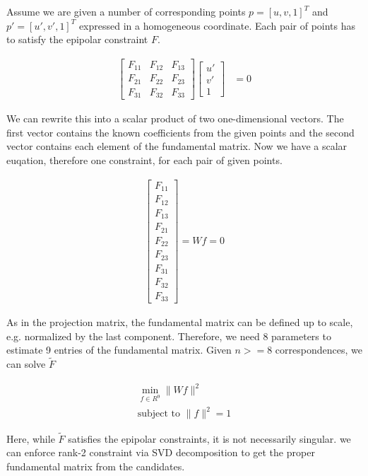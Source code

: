 \documentclass[twoside]{article}
\begin{document}
Assume we are given a number of corresponding points $p = [u, v, 1]^T$ and $p'= [u',v',1]^T$ expressed in a homogeneous coordinate. Each pair of points has to satisfy the epipolar constraint $F$.

\begin{align}
[u, v, 1] \begin{bmatrix}
F_{11} & F_{12} & F_{13} \\
F_{21} & F_{22} & F_{23} \\
F_{31} & F_{32} & F_{33}
\end{bmatrix} \begin{bmatrix}
u' \\ v' \\ 1
\end{bmatrix} &= 0
\end{align}

We can rewrite this into a scalar product of two one-dimensional vectors. The first vector contains the known coefficients from the given points and the second vector contains each element of the fundamental matrix. Now we have a scalar euqation, therefore one constraint, for each pair of given points.

\begin{align}
[uu', uv', u, vu', vv', v, u', v', 1]\begin{bmatrix}
F_{11} \\F_{12} \\F_{13} \\F_{21} \\F_{22} \\F_{23} \\F_{31} \\F_{32} \\F_{33}
\end{bmatrix} = Wf = 0
\end{align}

As in the projection matrix, the fundamental matrix can be defined up to scale, e.g. normalized by the last component. Therefore, we need 8 parameters to estimate 9 entries of the fundamental matrix. Given $n>=8$ correspondences, we can solve $\tilde{F}$

\begin{align}
\min_{f\in{R^9}}\|Wf\|^2 \\
\text{subject to } \|f\|^2 = 1
\end{align}

Here, while $\tilde{F}$ satisfies the epipolar constraints, it is not necessarily singular. we can enforce rank-2 constraint via SVD decomposition to get the proper fundamental matrix from the candidates.
\end{document}
